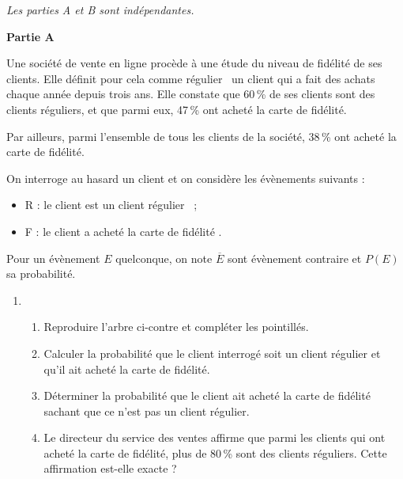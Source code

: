 \textit{Les parties A et B sont indépendantes.}

\smallskip

\begin{Centrage}
	\textbf{Partie A}
\end{Centrage}

Une société de vente en ligne procède à une étude du niveau de fidélité de ses clients. Elle définit pour cela comme \og régulier \fg\ un client qui a fait des achats chaque année depuis trois ans. Elle constate que 60\,\% de ses clients sont des clients réguliers, et que parmi eux, 47\,\% ont acheté la carte de fidélité.

Par ailleurs, parmi l'ensemble de tous les clients de la société, 38\,\% ont acheté la carte de fidélité.

On interroge au hasard un client et on considère les évènements suivants :

\begin{itemize}
	\item R : \og le client est un client régulier \fg\ ;
	\item F : \og le client a acheté la carte de fidélité \fg.
\end{itemize}

Pour un évènement $E$ quelconque, on note $\overline{E}$ sont évènement contraire et $P(E)$ sa probabilité.

\begin{wrapstuff}[r]
\end{wrapstuff}

\begin{enumerate}
	\item 
	
	\begin{enumerate}
		\item Reproduire l'arbre ci-contre et compléter les pointillés.
		\item Calculer la probabilité que le client interrogé soit un client régulier et qu'il ait acheté la carte de fidélité.
		\item Déterminer la probabilité que le client ait acheté la carte de fidélité sachant que ce n'est pas un client régulier.
		\item Le directeur du service des ventes affirme que parmi les clients qui ont acheté la carte de fidélité, plus de 80\,\% sont des clients réguliers. Cette affirmation est-elle exacte ?
	\end{enumerate}
\end{enumerate}

